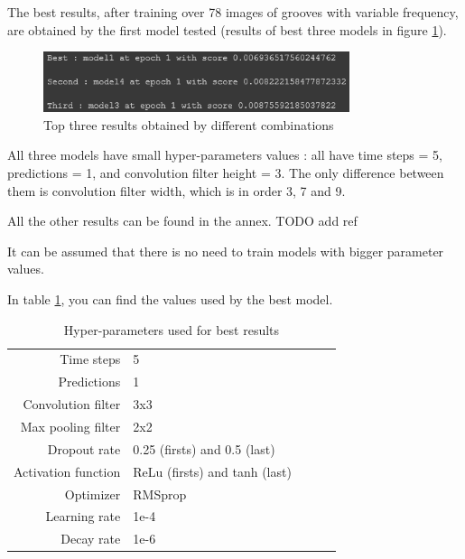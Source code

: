 \documentclass[12pt, twoside]{article}
\begin{document}
The best results, after training over 78 images of grooves with variable frequency, are obtained by the first model tested (results of best three models in figure \ref{resp1v4}).

\begin{figure}
	\centering
	\includegraphics[width=0.8\textwidth]{../images/resp1v4.png}
	\caption{Top three results obtained by different combinations}
	\label{resp1v4}
\end{figure}

All three models have small hyper-parameters values : all have time steps = 5, predictions = 1, and convolution filter height = 3. The only difference between them is convolution filter width, which is in order 3, 7 and 9.

All the other results can be found in the annex. TODO add ref

It can be assumed that there is no need to train models with bigger parameter values.

In table \ref{hpm1}, you can find the values used by the best model.

\begin{table}
	\begin{tabular}{|r|l|lll}
		\cline{1-2}
		Time steps        & 5        &  &  &  \\ \cline{1-2}
		Predictions       & 1     &  &  &  \\ \cline{1-2}
		Convolution filter    & 3x3 &  &  &  \\ \cline{1-2}
		Max pooling filter    & 2x2        &  &  &  \\ \cline{1-2}
		Dropout rate   & 0.25 (firsts) and 0.5 (last)          &  &  &  \\ \cline{1-2}
		Activation function & ReLu (firsts) and tanh (last)        &  &  &  \\ \cline{1-2}
		Optimizer & RMSprop         &  &  &  \\ \cline{1-2}
		Learning rate & 1e-4         &  &  &  \\ \cline{1-2}
		Decay rate & 1e-6         &  &  &  \\ \cline{1-2}
	\end{tabular}
	\caption{Hyper-parameters used for best results}
	\label{hpm1}
\end{table}
\end{document}
